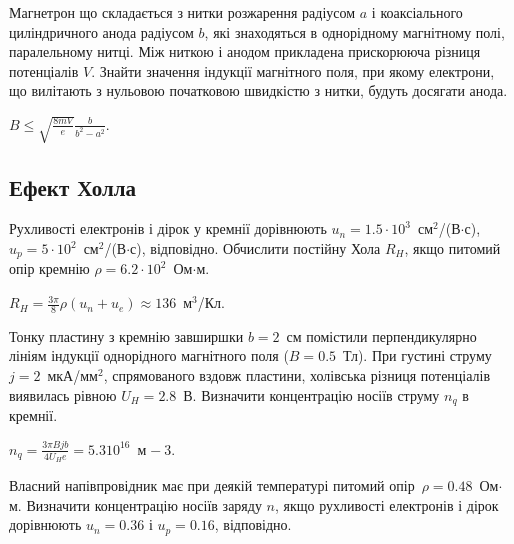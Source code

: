 \begin{problem}
Магнетрон що складається з нитки розжарення радіусом $a$ і коаксіального циліндричного анода радіусом $b$, які знаходяться в однорідному магнітному полі, паралельному нитці. Між ниткою і анодом прикладена прискорююча різниця потенціалів $V$. Знайти значення індукції магнітного
поля, при якому електрони, що вилітають з нульовою початковою швидкістю з нитки, будуть досягати анода.
\begin{solution}
	$B \le \sqrt{\frac{8mV}{e}} \frac{b}{b^2 - a^2}$.
\end{solution}
\end{problem}


\subsection*{Ефект Холла}


\begin{problem}%
    Рухливості електронів і дірок у кремнії дорівнюють $u_n = 1.5\cdot10^3$~см$^2$/(В$\cdot$с), $u_p = 5\cdot10^2$~см$^2$/(В$\cdot$с), відповідно. Обчислити постійну Хола $R_H$, якщо питомий опір кремнію $\rho = 6.2\cdot10^2$~Ом$\cdot$м.
\begin{solution}
$R_H = \frac{3\pi}8 \rho (u_n + u_e) \approx 136$~м$^3$/Кл.
\end{solution}
\end{problem}


\begin{problem}%
    Тонку пластину з кремнію завширшки $b = 2$~см помістили перпендикулярно лініям індукції однорідного магнітного поля ($B = 0.5$~Тл). При густині струму $j = 2$~мкА/мм$^2$, спрямованого вздовж пластини, холівська різниця потенціалів виявилась рівною $U_H = 2.8$~В. Визначити концентрацію носіїв струму $n_q$ в кремнії.
\begin{solution}
$n_q = \frac{3\pi B j b}{4U_H e} = 5.3 10^{16}$~м$^{}-3$.
\end{solution}
\end{problem}

\begin{problem}%
Власний напівпровідник має при деякій температурі питомий опір~$\rho = 0.48$~Ом$\cdot$м.
Визначити концентрацію носіїв заряду $n$, якщо рухливості електронів і дірок дорівнюють
$u_n = 0.36$ і $u_p = 0.16$, відповідно.
\end{problem}


